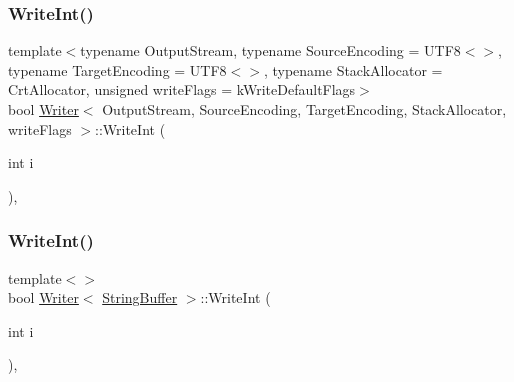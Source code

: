 \subsubsection{\texorpdfstring{Write\+Int()}{WriteInt()}\hspace{0.1cm}{\footnotesize\ttfamily [1/2]}}
{\footnotesize\ttfamily template$<$typename Output\+Stream, typename Source\+Encoding = U\+T\+F8$<$$>$, typename Target\+Encoding = U\+T\+F8$<$$>$, typename Stack\+Allocator = Crt\+Allocator, unsigned write\+Flags = k\+Write\+Default\+Flags$>$ \\
bool \hyperlink{classWriter}{Writer}$<$ Output\+Stream, Source\+Encoding, Target\+Encoding, Stack\+Allocator, write\+Flags $>$\+::Write\+Int (\begin{DoxyParamCaption}\item[{int}]{i }\end{DoxyParamCaption})\hspace{0.3cm}{\ttfamily [inline]}, {\ttfamily [protected]}}

\mbox{\label{classWriter_abefb163a93b376d056edecad5a7a82ef}} 
\subsubsection{\texorpdfstring{Write\+Int()}{WriteInt()}\hspace{0.1cm}{\footnotesize\ttfamily [2/2]}}
{\footnotesize\ttfamily template$<$$>$ \\
bool \hyperlink{classWriter}{Writer}$<$ \hyperlink{fwd_8h_ab956b6537825abf8aac4112e81cfad7e}{String\+Buffer} $>$\+::Write\+Int (\begin{DoxyParamCaption}\item[{int}]{i }\end{DoxyParamCaption})\hspace{0.3cm}{\ttfamily [inline]}, {\ttfamily [protected]}}

\mbox{\label{classWriter_aa58d3f80c06394648de5055ecfb41587}} 
